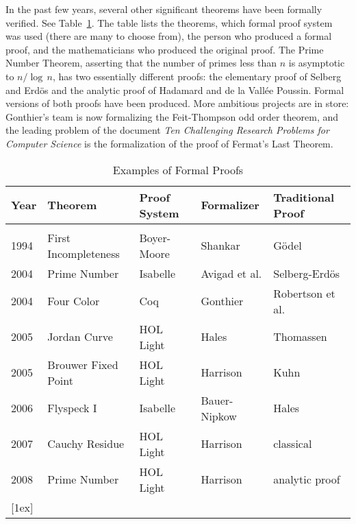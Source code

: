 \documentclass{llncs}
\begin{document}
In the past few years, several other significant theorems have been
formally verified. See Table~\ref{table}.  The table lists the
theorems, which formal proof system was used (there are many to choose from), the person who
produced a formal proof, and the mathematicians who produced the
original proof.  The Prime Number Theorem, asserting that the
number of primes less than $n$ is asymptotic to $n/\log\,n$, has
two essentially different proofs: the elementary proof of
Selberg and Erd\"os and the analytic proof of Hadamard and
de la Vall\'ee Poussin.  Formal versions of both proofs have
been produced.   More ambitious projects are in store:
Gonthier's team is now formalizing the Feit-Thompson odd order theorem, and
 the leading problem of the document {\it Ten Challenging
Research Problems for Computer Science} is the formalization
of the proof of Fermat's Last Theorem.






\smallskip

\begin{table}[ht]
\caption{Examples of Formal Proofs}
\centering
\begin{tabular}{l l l l l}
\hline
Year\hspace{0.5em} & Theorem\hspace{6em} & Proof System\hspace{2em}  & Formalizer\hspace{3em} & Traditional Proof\\ [0.5ex]
\hline \\
1994 & First Incompleteness & Boyer-Moore   & Shankar &  G\"odel \\
2004 & Prime Number & Isabelle & Avigad et al. & Selberg-Erd\"os\\
2004 & Four Color & Coq & Gonthier & Robertson et al.\\
2005 & Jordan Curve  & HOL Light & Hales & Thomassen \\
2005 & Brouwer Fixed Point & HOL Light & Harrison & Kuhn \\
2006 & Flyspeck I & Isabelle & Bauer-Nipkow & Hales \\
2007 & Cauchy Residue & HOL Light & Harrison & classical \\
2008 & Prime Number & HOL Light & Harrison & analytic proof \\
 [1ex]
\hline
\end{tabular}
\label{table}
\end{table}
\end{document}

